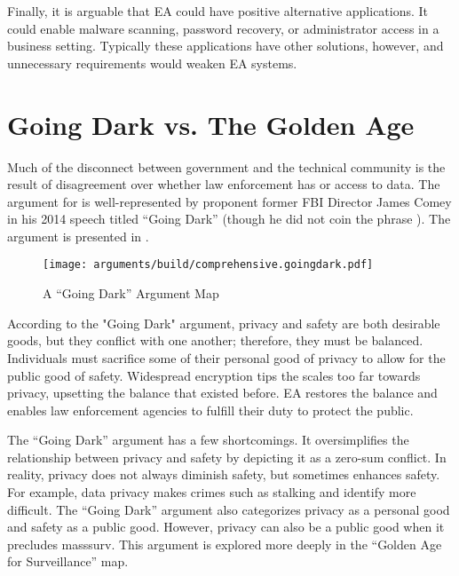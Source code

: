 Finally, it is arguable that \ac{EA} could have positive alternative applications. It could enable malware scanning,
password recovery, or administrator access in a business setting. Typically these applications have other solutions,
however, and unnecessary requirements would weaken \ac{EA} systems.


\section{Going Dark vs. The Golden Age}

Much of the disconnect between government and the technical community is the result of disagreement over whether law
enforcement has  or  access to data. The argument for  is well-represented by
proponent former \ac{FBI} Director James Comey in his 2014 speech titled ``Going Dark'' \cite{comey_2014} (though he did
not coin the phrase \cite{swire_encryption_2011}). The argument is presented in .

\begin{figure}[t!]
  \centering\CaptionFontSize
  \texttt{[image: arguments/build/comprehensive.goingdark.pdf]}
  \caption{A ``Going Dark'' Argument Map}
  \label{fig-arg-going-dark}
\end{figure}

According to the "Going Dark" argument, privacy and safety are both desirable goods, but they conflict with one another;
therefore, they must be balanced. Individuals must sacrifice some of their personal good of privacy to allow for the
public good of safety. Widespread encryption tips the scales too far towards privacy, upsetting the balance that existed
before. \ac{EA} restores the balance and enables law enforcement agencies to fulfill their duty to protect the public.

The ``Going Dark'' argument has a few shortcomings. It oversimplifies the relationship between privacy and safety by
depicting it as a zero-sum conflict. In reality, privacy does not always diminish safety, but sometimes enhances safety.
For example, data privacy makes crimes such as stalking and identify more difficult. The ``Going Dark'' argument also
categorizes privacy as a personal good and safety as a public good. However, privacy can also be a public good when it
precludes \ac{masssurv}. This argument is explored more deeply in the ``Golden Age for Surveillance'' map.

